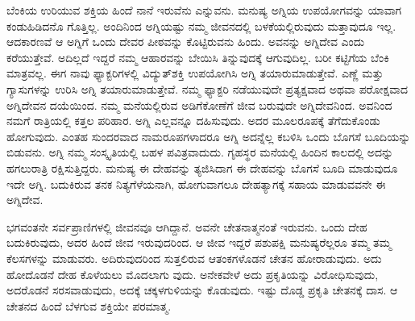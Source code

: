 ಬೆಂಕಿಯ ಉರಿಯುವ ಶಕ್ತಿಯ ಹಿಂದೆ ನಾನೆ ಇರುವೆನು ಎನ್ನುವನು. ಮನುಷ್ಯ ಅಗ್ನಿಯ ಉಪಯೋಗವನ್ನು ಯಾವಾಗ ಕಂಡುಹಿಡಿದನೊ ಗೊತ್ತಿಲ್ಲ. ಅಂದಿನಿಂದ ಅಗ್ನಿಯಷ್ಟು ನಮ್ಮ ಜೀವನದಲ್ಲಿ ಬಳಕೆಯಲ್ಲಿರುವುದು ಮತ್ತಾವುದೂ ಇಲ್ಲ. ಆದಕಾರಣವೆ ಆ ಅಗ್ನಿಗೆ ಒಂದು ದೇವರ ಪೀಠವನ್ನು ಕೊಟ್ಟಿರುವನು ಹಿಂದು. ಅವನನ್ನು ಅಗ್ನಿದೇವ ಎಂದು ಕರೆಯುತ್ತೇವೆ. ಅದಿಲ್ಲದೆ ಇದ್ದರೆ ನಮ್ಮ ಆಹಾರವನ್ನು ಬೇಯಿಸಿ ತಿನ್ನುವುದಕ್ಕೆ ಆಗುವುದಿಲ್ಲ. ಬರೀ ಕಟ್ಟಿಗೆಯ ಬೆಂಕಿ ಮಾತ್ರವಲ್ಲ. ಈಗ ನಾವು ಫ್ಯಾಕ್ಟರಿಗಳಲ್ಲಿ ವಿದ್ಯುತ್​ಶಕ್ತಿ ಉಪಯೋಗಿಸಿ ಅಗ್ನಿ ತಯಾರುಮಾಡುತ್ತೇವೆ. ಎಣ್ಣೆ ಮತ್ತು ಗ್ಯಾಸುಗಳನ್ನು ಉರಿಸಿ ಅಗ್ನಿ ತಯಾರುಮಾಡುತ್ತೇವೆ. ನಮ್ಮ ಫ್ಯಾಕ್ಟರಿ ನಡೆಯುವುದೇ ಪ್ರತ್ಯಕ್ಷವಾದ ಅಥವಾ ಪರೋಕ್ಷವಾದ ಅಗ್ನಿದೇವನ ದಯೆಯಿಂದ. ನಮ್ಮ ಮನೆಯಲ್ಲಿರುವ ಅಡಿಗೆಕೋಣೆಗೆ ಜೀವ ಬರುವುದೇ ಅಗ್ನಿದೇವನಿಂದ. ಅವನಿಂದ ನಮಗೆ ರಾತ್ರಿಯಲ್ಲಿ ಕತ್ತಲ ಪರಿಹಾರ. ಅಗ್ನಿ ಎಲ್ಲವನ್ನೂ ದಹಿಸುವುದು. ಅದರ ಮೂಲರೂಪಕ್ಕೆ ತೆಗೆದುಕೊಂಡು ಹೋಗುವುದು. ಎಂತಹ ಸುಂದರವಾದ ನಾಮರೂಪಗಳಾದರೂ ಅಗ್ನಿ ಅದನ್ನೆಲ್ಲ ಕಬಳಿಸಿ ಒಂದು ಬೊಗಸೆ ಬೂದಿಯನ್ನು ಬಿಡುವನು. ಅಗ್ನಿ ನಮ್ಮ ಸಂಸ್ಕೃತಿಯಲ್ಲಿ ಬಹಳ ಪವಿತ್ರವಾದುದು. ಗೃಹಸ್ಥರ ಮನೆಯಲ್ಲಿ ಹಿಂದಿನ ಕಾಲದಲ್ಲಿ ಅದನ್ನು ಹಗಲುರಾತ್ರಿ ರಕ್ಷಿಸುತ್ತಿದ್ದರು. ಮನುಷ್ಯ ಈ ದೇಹವನ್ನು ತ್ಯಜಿಸಿದಾಗ ಈ ದೇಹವನ್ನು ಬೊಗಸೆ ಬೂದಿ ಮಾಡುವುದೂ ಇದೇ ಅಗ್ನಿ. ಬದುಕಿರುವ ತನಕ ನಿತ್ಯಗೆಳೆಯನಾಗಿ, ಹೋಗುವಾಗಲೂ ದೇಹತ್ಯಾಗಕ್ಕೆ ಸಹಾಯ ಮಾಡುವವನೇ ಈ ಅಗ್ನಿದೇವ. 

ಭಗವಂತನೇ ಸರ್ವಪ್ರಾಣಿಗಳಲ್ಲಿ ಜೀವನವೂ ಆಗಿದ್ದಾನೆ. ಅವನೇ ಚೇತನಾತ್ಮನಂತೆ ಇರುವನು. ಒಂದು ದೇಹ ಬದುಕಿರುವುದು, ಅದರ ಹಿಂದೆ ಜೀವ ಇರುವುದರಿಂದ. ಆ ಜೀವ ಇದ್ದರೆ ಪಶುಪಕ್ಷಿ ಮನುಷ್ಯರೆಲ್ಲರೂ ತಮ್ಮ ತಮ್ಮ ಕೆಲಸಗಳನ್ನು ಮಾಡುವರು. ಅದಿರುವುದರಿಂದ ಸುತ್ತಲಿರುವ ಆತಂಕಗಳೊಡನೆ ಚೇತನ ಹೋರಾಡುವುದು. ಅದು ಹೋದೊಡನೆ ದೇಹ ಕೊಳೆಯಲು ಮೊದಲಾಗು ವುದು. ಅನೇಕವೇಳೆ ಅದು ಪ್ರಕೃತಿಯನ್ನು ವಿರೋಧಿಸುವುದು, ಅದರೊಡನೆ ಸರಸವಾಡುವುದು, ಅದಕ್ಕೆ ಚಕ್ಕಳಗುಳಿಯನ್ನು ಕೊಡುವುದು. ಇಷ್ಟು ದೊಡ್ಡ ಪ್ರಕೃತಿ ಚೇತನಕ್ಕೆ ದಾಸ. ಆ ಚೇತನದ ಹಿಂದೆ ಬೆಳಗುವ ಶಕ್ತಿಯೇ ಪರಮಾತ್ಮ.

